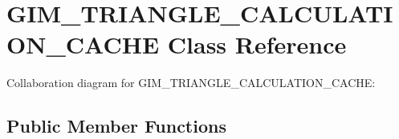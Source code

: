 \hypertarget{class_g_i_m___t_r_i_a_n_g_l_e___c_a_l_c_u_l_a_t_i_o_n___c_a_c_h_e}{\section{G\+I\+M\+\_\+\+T\+R\+I\+A\+N\+G\+L\+E\+\_\+\+C\+A\+L\+C\+U\+L\+A\+T\+I\+O\+N\+\_\+\+C\+A\+C\+H\+E Class Reference}
\label{class_g_i_m___t_r_i_a_n_g_l_e___c_a_l_c_u_l_a_t_i_o_n___c_a_c_h_e}
}


Collaboration diagram for G\+I\+M\+\_\+\+T\+R\+I\+A\+N\+G\+L\+E\+\_\+\+C\+A\+L\+C\+U\+L\+A\+T\+I\+O\+N\+\_\+\+C\+A\+C\+H\+E\+:
\subsection*{Public Member Functions}
